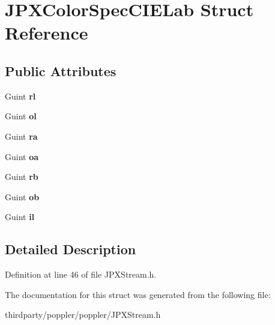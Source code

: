 \hypertarget{struct_j_p_x_color_spec_c_i_e_lab}{}\section{J\+P\+X\+Color\+Spec\+C\+I\+E\+Lab Struct Reference}
\label{struct_j_p_x_color_spec_c_i_e_lab}
\subsection*{Public Attributes}
\begin{DoxyCompactItemize}
\item 
\mbox{\label{struct_j_p_x_color_spec_c_i_e_lab_a17ef1e17aa5ce1605eae4146c69949fc}} 
Guint {\bfseries rl}
\item 
\mbox{\label{struct_j_p_x_color_spec_c_i_e_lab_a27fb112cda08e56c4e674333364470f2}} 
Guint {\bfseries ol}
\item 
\mbox{\label{struct_j_p_x_color_spec_c_i_e_lab_a577f53fb7edc04f8e20a33814adca738}} 
Guint {\bfseries ra}
\item 
\mbox{\label{struct_j_p_x_color_spec_c_i_e_lab_a06587305508dec185f8e26984f023074}} 
Guint {\bfseries oa}
\item 
\mbox{\label{struct_j_p_x_color_spec_c_i_e_lab_ab94723b36a4e2bd66d5f282470bde084}} 
Guint {\bfseries rb}
\item 
\mbox{\label{struct_j_p_x_color_spec_c_i_e_lab_a942eace7295326964818415b661fc4de}} 
Guint {\bfseries ob}
\item 
\mbox{\label{struct_j_p_x_color_spec_c_i_e_lab_af0e29d7470b99be5374412d3c1ee09e6}} 
Guint {\bfseries il}
\end{DoxyCompactItemize}


\subsection{Detailed Description}


Definition at line 46 of file J\+P\+X\+Stream.\+h.



The documentation for this struct was generated from the following file\+:\begin{DoxyCompactItemize}
\item 
thirdparty/poppler/poppler/J\+P\+X\+Stream.\+h\end{DoxyCompactItemize}
